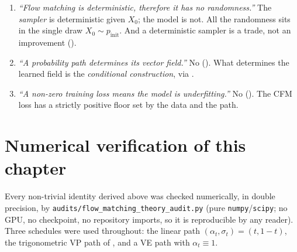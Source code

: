 \documentclass[11pt,a4paper]{report}
\theoremstyle{definition}
\theoremstyle{remark}
\newcommand{\file}[1]{\texttt{#1}}
\begin{document}
\begin{enumerate}
\item \emph{``Flow matching is deterministic, therefore it has no
      randomness.''}
      The \emph{sampler} is deterministic given $X_0$; the model is not.
      All the randomness sits in the single draw $X_0\sim p_{\mathrm{init}}$.
      And a deterministic sampler is a trade, not an improvement
      ().

\item \emph{``A probability path determines its vector field.''}
      No (). What determines the learned field is
      the \emph{conditional construction}, via
      .

\item \emph{``A non-zero training loss means the model is underfitting.''}
      No (). The CFM loss has a strictly positive
      floor set by the data and the path.
\end{enumerate}

\section{Numerical verification of this chapter}
\label{sec:fm-numerics}

Every non-trivial identity derived above was checked numerically, in
double precision, by \file{audits/flow\_matching\_theory\_audit.py} (pure
\texttt{numpy}/\texttt{scipy}; no GPU, no checkpoint, no repository
imports, so it is reproducible by any reader). Three schedules were used
throughout: the linear path $(\alpha_t,\sigma_t)=(t,1-t)$, the
trigonometric VP path of , and a VE path with
$\alpha_t\equiv1$.
\end{document}
